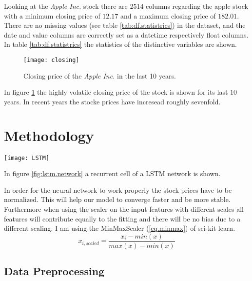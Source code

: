 \documentclass[fleqn,10pt]{SelfArx} %
\begin{document}
Looking at the \textit{Apple Inc.} stock there are 2514 columns regarding the apple stock with a minimum closing price of $12.17$ and a maximum closing price of $182.01$. There are no missing values (see table \ref{tab:df.statistrics}) in the dataset, and the date and value columns are correctly set as a datetime respectively float columns. In table \ref{tab:df.statistrics} the statistics of the distinctive variables are shown.

\begin{figure}[ht]\centering
	\texttt{[image: closing]}
	\caption{Closing price of the \textit{Apple Inc.} in the last 10 years.}
	\label{fig:results}
\end{figure}

In figure \ref{fig:results} the highly volatile closing price of the stock is shown for its last 10 years. In recent years the stocke prices have incresead roughly sevenfold. 





\section{Methodology}

\begin{figure*}[ht]\centering %
	\texttt{[image: LSTM]}
	\caption{The reccurent cell of a LSTM network \cite{LSTM}.}
	\label{fig:lstm.network}
\end{figure*}
In figure \ref{fig:lstm.network} a recurrent cell of a LSTM network is shown.

In order for the neural network to work properly the stock prices have to be normalized. This will help our model to converge faster and be more stable. Furthermore when using the scaler on the input features with different scales all features will contribute equally to the fitting and there will be no bias due to a different scaling. I am using the MinMaxScaler (\ref{eq.minmax}) of sci-kit learn.
\begin{equation}
x_{i,scaled}=\dfrac{x_i-min(x)}{max(x)-min(x)}
\label{eq.minmax}
\end{equation}



\subsection{Data Preprocessing}
\end{document}
